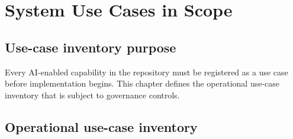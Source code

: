 \chapter{System Use Cases in Scope}
\label{ch:usecases}

\section{Use-case inventory purpose}

Every AI-enabled capability in the repository must be registered as a use case
before implementation begins. This chapter defines the operational use-case
inventory that is subject to governance controls.

\section{Operational use-case inventory}

